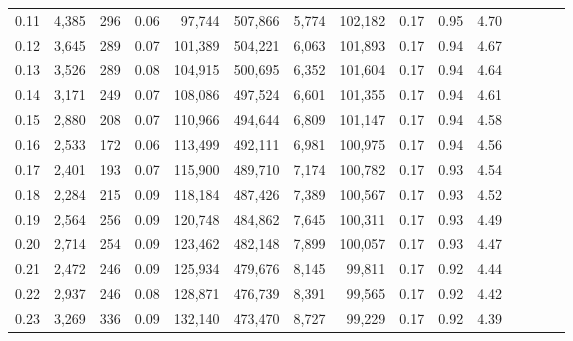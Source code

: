 \begin{tabular}{rrrcrrrrrrrrrrr}
0.11 &   4,385 &    296 &                                       0.06 &   97,744 &  507,866 &    5,774 &  102,182 &  0.17 &  0.95 &                         4.70 \\
0.12 &   3,645 &    289 &                                       0.07 &  101,389 &  504,221 &    6,063 &  101,893 &  0.17 &  0.94 &                         4.67 \\
0.13 &   3,526 &    289 &                                       0.08 &  104,915 &  500,695 &    6,352 &  101,604 &  0.17 &  0.94 &                         4.64 \\
0.14 &   3,171 &    249 &                                       0.07 &  108,086 &  497,524 &    6,601 &  101,355 &  0.17 &  0.94 &                         4.61 \\
0.15 &   2,880 &    208 &                                       0.07 &  110,966 &  494,644 &    6,809 &  101,147 &  0.17 &  0.94 &                         4.58 \\
0.16 &   2,533 &    172 &                                       0.06 &  113,499 &  492,111 &    6,981 &  100,975 &  0.17 &  0.94 &                         4.56 \\
0.17 &   2,401 &    193 &                                       0.07 &  115,900 &  489,710 &    7,174 &  100,782 &  0.17 &  0.93 &                         4.54 \\
0.18 &   2,284 &    215 &                                       0.09 &  118,184 &  487,426 &    7,389 &  100,567 &  0.17 &  0.93 &                         4.52 \\
0.19 &   2,564 &    256 &                                       0.09 &  120,748 &  484,862 &    7,645 &  100,311 &  0.17 &  0.93 &                         4.49 \\
0.20 &   2,714 &    254 &                                       0.09 &  123,462 &  482,148 &    7,899 &  100,057 &  0.17 &  0.93 &                         4.47 \\
0.21 &   2,472 &    246 &                                       0.09 &  125,934 &  479,676 &    8,145 &   99,811 &  0.17 &  0.92 &                         4.44 \\
0.22 &   2,937 &    246 &                                       0.08 &  128,871 &  476,739 &    8,391 &   99,565 &  0.17 &  0.92 &                         4.42 \\
0.23 &   3,269 &    336 &                                       0.09 &  132,140 &  473,470 &    8,727 &   99,229 &  0.17 &  0.92 &                         4.39 \\

\end{tabular}
